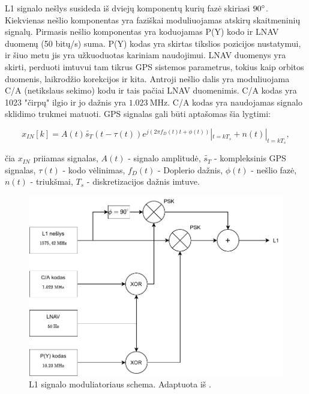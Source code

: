 \documentclass[main.tex]{subfiles}
\begin{document}
L1 signalo nešlys susideda iš dviejų komponentų kurių fazė skiriasi $90\degree$.
Kiekvienas nešlio komponentas yra faziškai moduliuojamas atskirų skaitmeninių signalų.
Pirmasis nešlio komponentas yra koduojamas P(Y) kodo ir LNAV duomenų (50 bitų/s) suma.
P(Y) kodas yra skirtas tikslios pozicijos nustatymui, ir šiuo metu jis yra užkuoduotas
kariniam naudojimui.
LNAV duomenys yra skirti, perduoti imtuvui tam tikrus GPS sistemos parametrus, tokius
kaip orbitos duomenis, laikrodžio korekcijos ir kita.
Antroji nešlio dalis yra moduliuojama C/A (netikslaus sekimo) kodu ir tais pačiai LNAV
duomenimis. C/A kodas yra 1023 "čirpų" ilgio ir jo dažnis yra $1.023\ \mathrm{MHz}$.
C/A kodas yra naudojamas signalo sklidimo trukmei matuoti. GPS signalas gali būti
aptašomas šia lygtimi:

\begin{equation}
    x_{IN}[k] = A(t) \widetilde{s_T}(t-\tau(t))e^{j(2\pi f_D(t)t+\phi(t))} |_{t=kT_s} + n(t) |_{t=kT_s},
    \label{eq:gps_signal}
\end{equation}

\noindent čia $x_{IN}$ priiamas signalas, $A(t)$ - signalo amplitudė, $\widetilde{s_T}$
- kompleksinis GPS signalas, $\tau(t)$ - kodo vėlinimas, $f_D(t)$ - Doplerio dažnis,
$\phi(t)$ - nešlio fazė, $n(t)$ - triukšmai, $T_s$ - diskretizacijos dažnis imtuve.

\begin{figure}[h]
    \begin{centering}
    \includegraphics[scale=0.85]{drawings/l1_signal}
    \par\end{centering}
    \protect\caption{\label{fig:l1_signal}L1 signalo moduliatoriaus schema. Adaptuota iš \cite{Sadeghi2008TimeSS}.}
\end{figure}
\end{document}
